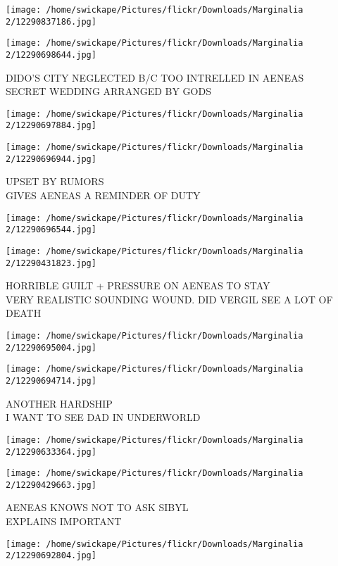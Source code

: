 \documentclass[10pt,letterpaper]{article}
\begin{document}
\texttt{[image: /home/swickape/Pictures/flickr/Downloads/Marginalia 2/12290837186.jpg]}

\vspace{0.25in}
\texttt{[image: /home/swickape/Pictures/flickr/Downloads/Marginalia 2/12290698644.jpg]}

DIDO'S CITY NEGLECTED B/C TOO INTRELLED IN AENEAS\\
SECRET WEDDING ARRANGED BY GODS
\pagebreak

\texttt{[image: /home/swickape/Pictures/flickr/Downloads/Marginalia 2/12290697884.jpg]}

\vspace{0.25in}
\texttt{[image: /home/swickape/Pictures/flickr/Downloads/Marginalia 2/12290696944.jpg]}

UPSET BY RUMORS\\
GIVES AENEAS A REMINDER OF DUTY
\pagebreak

\texttt{[image: /home/swickape/Pictures/flickr/Downloads/Marginalia 2/12290696544.jpg]}

\vspace{0.25in}
\texttt{[image: /home/swickape/Pictures/flickr/Downloads/Marginalia 2/12290431823.jpg]}

HORRIBLE GUILT + PRESSURE ON AENEAS TO STAY\\
VERY REALISTIC SOUNDING WOUND.  DID VERGIL SEE A LOT OF DEATH
\pagebreak

\texttt{[image: /home/swickape/Pictures/flickr/Downloads/Marginalia 2/12290695004.jpg]}

\vspace{0.25in}
\texttt{[image: /home/swickape/Pictures/flickr/Downloads/Marginalia 2/12290694714.jpg]}

ANOTHER HARDSHIP\\
I WANT TO SEE DAD IN UNDERWORLD
\pagebreak

\texttt{[image: /home/swickape/Pictures/flickr/Downloads/Marginalia 2/12290633364.jpg]}

\vspace{0.25in}
\texttt{[image: /home/swickape/Pictures/flickr/Downloads/Marginalia 2/12290429663.jpg]}

AENEAS KNOWS NOT TO ASK SIBYL\\
EXPLAINS IMPORTANT
\pagebreak

\texttt{[image: /home/swickape/Pictures/flickr/Downloads/Marginalia 2/12290692804.jpg]}
\end{document}
